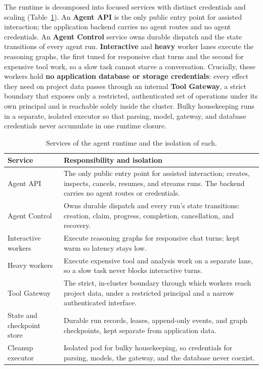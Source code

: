 The runtime is decomposed into focused services with distinct credentials and
scaling (Table~\ref{tab:runtime-services}). An \textbf{Agent API} is the only
public entry point for assisted interaction; the application backend carries no
agent routes and no agent credentials. An \textbf{Agent Control} service owns
durable dispatch and the state transitions of every agent run. \textbf{Interactive}
and \textbf{heavy} worker lanes execute the reasoning graphs, the first tuned for
responsive chat turns and the second for expensive tool work, so a slow task cannot
starve a conversation. Crucially, these workers hold \textbf{no application database
or storage credentials}: every effect they need on project data passes through an
internal \textbf{Tool Gateway}, a strict boundary that exposes only a restricted,
authenticated set of operations under its own principal and is reachable solely
inside the cluster. Bulky housekeeping runs in a separate, isolated executor so
that parsing, model, gateway, and database credentials never accumulate in one
runtime closure.

\begin{table}[H]
  \centering
  \small
  \begin{tabularx}{\linewidth}{@{}>{\raggedright\arraybackslash}p{3.3cm} >{\raggedright\arraybackslash}X@{}}
    \toprule
    \textbf{Service} & \textbf{Responsibility and isolation} \\
    \midrule
    Agent API & The only public entry point for assisted interaction; creates,
      inspects, cancels, resumes, and streams runs. The backend carries no agent
      routes or credentials. \\
    \addlinespace
    Agent Control & Owns durable dispatch and every run's state transitions:
      creation, claim, progress, completion, cancellation, and recovery. \\
    \addlinespace
    Interactive workers & Execute reasoning graphs for responsive chat turns; kept
      warm so latency stays low. \\
    \addlinespace
    Heavy workers & Execute expensive tool and analysis work on a separate lane, so
      a slow task never blocks interactive turns. \\
    \addlinespace
    Tool Gateway & The strict, in-cluster boundary through which workers reach
      project data, under a restricted principal and a narrow authenticated
      interface. \\
    \addlinespace
    State and checkpoint store & Durable run records, leases, append-only events,
      and graph checkpoints, kept separate from application data. \\
    \addlinespace
    Cleanup executor & Isolated pod for bulky housekeeping, so credentials for
      parsing, models, the gateway, and the database never coexist. \\
    \bottomrule
  \end{tabularx}
  \caption{Services of the agent runtime and the isolation of each.}
  \label{tab:runtime-services}
\end{table}


